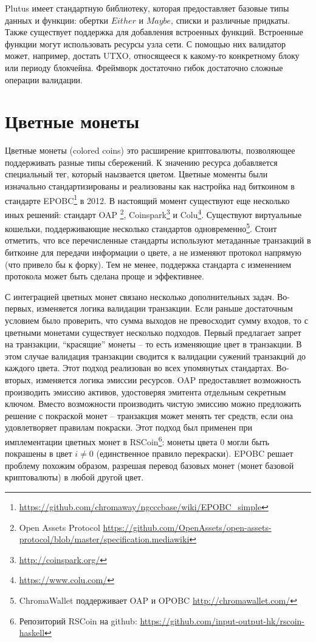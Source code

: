 \documentclass[]{itmo-student-thesis}
\begin{document}
Plutus имеет стандартную библиотеку, которая предоставляет базовые
типы данных и функции: обертки $Either$ и $Maybe$, списки и различные
придкаты. Также существует поддержка для добавления встроенных
функций. Встроенные функции могут использовать ресурсы узла сети. С
помощью них валидатор может, например, достать UTXO, относящееся к
какому-то конкретному блоку или периоду блокчейна. Фреймворк
достаточно гибок достаточно сложные операции валидации.

\section{Цветные монеты}

Цветные монеты (colored coins) это расширение криптовалюты,
позволяющее поддерживать разные типы сбережений. К значению ресурса
добавляется специальный тег, который наызвается цветом. Цветные
моменты были изначально стандартизированы и реализованы как настройка
над биткоином в стандарте
EPOBC\footnote{\url{https://github.com/chromaway/ngcccbase/wiki/EPOBC_simple}}
в 2012. В настоящий момент существуют еще несколько иных решений:
стандарт OAP \footnote{Open Assets Protocol
  \url{https://github.com/OpenAssets/open-assets-protocol/blob/master/specification.mediawiki}},
Coinspark\footnote{\url{http://coinspark.org/}} и
Colu\footnote{\url{https://www.colu.com/}}. Существуют виртуальные
кошельки, поддерживающие несколько стандартов
одновременно\footnote{ChromaWallet поддерживает OAP и OPOBC
  \url{http://chromawallet.com/}}. Стоит отметить, что все
перечисленные стандарты используют метаданные транзакций в биткоине
для передачи информации о цвете, а не изменяют протокол напрямую (что
привело бы к форку). Тем не менее, поддержка стандарта с изменением
протокола может быть сделана проще и эффективнее.

С интеграцией цветных монет связано несколько дополнительных
задач. Во-первых, изменяется логика валидации транзакции. Если раньше
достаточным условием было проверить, что сумма выходов не превосходит
сумму входов, то с цветными монетами существует несколько
подходов. Первый предлагает запрет на транзакции, ``красящие'' монеты
-- то есть изменяющие цвет в транзакции. В этом случае валидация
транзакции сводится к валидации сужений транзакций до каждого
цвета. Этот подход реализован во всех упомянутых
стандартах. Во-вторых, изменяется логика эмиссии ресурсов. OAP
предоставляет возможность производить эмиссию активов, удостоверяя
эмитента отдельным секретным ключом. Вместо возможности производить
чистую эмиссию можно предложить решение с покраской монет --
транзакция может менять тег средств, если она удовлетворяет правилам
покраски. Этот подход был применен при имплементации цветных монет в
RSCoin\footnote{Репозиторий RSCoin на github:
  \url{https://github.com/input-output-hk/rscoin-haskell}}: монеты
цвета $0$ могли быть покрашены в цвет $i \neq 0$ (единственное правило
перекраски). EPOBC решает проблему похожим образом, разрешая перевод
базовых монет (монет базовой криптовалюты) в любой другой цвет.
\end{document}
